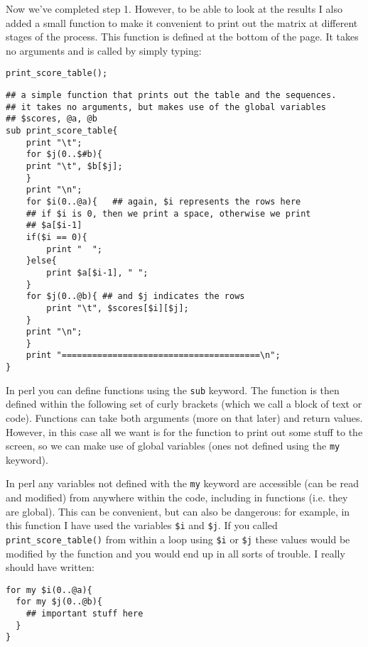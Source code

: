 \documentclass[11pt]{article}
\renewcommand\scriptsize\normalsize
\begin{document}
Now we've completed step 1. However, to be able to look at the results I also
added a small function to make it convenient to print out the
matrix at different stages of the process. This function is defined at the
bottom of the page. It takes no arguments and is called by simply typing:
\begin{verbatim}
print_score_table();
\end{verbatim}

\begin{verbatim}
## a simple function that prints out the table and the sequences.
## it takes no arguments, but makes use of the global variables
## $scores, @a, @b
sub print_score_table{
    print "\t";
    for $j(0..$#b){
	print "\t", $b[$j];
    }
    print "\n";
    for $i(0..@a){   ## again, $i represents the rows here
	## if $i is 0, then we print a space, otherwise we print
	## $a[$i-1]
	if($i == 0){
	    print "  ";
	}else{
	    print $a[$i-1], " ";
	}
	for $j(0..@b){ ## and $j indicates the rows
	    print "\t", $scores[$i][$j];
	}
	print "\n";
    }
    print "=======================================\n";
}
\end{verbatim}

In perl you can define functions using the \texttt{sub} keyword. The function
is then defined within the following set of curly brackets (which we call a
block of text or code). Functions can take both arguments (more on that later)
and return values. However, in this case all we want is for the function to
print out some stuff to the screen, so we can make use of global variables
(ones not defined using the \texttt{my} keyword). 

In perl any variables not defined with the
\texttt{my} keyword are accessible (can be read and modified) from anywhere
within the code, including in functions (i.e. they are global). This can be convenient, but can also
be dangerous: for example, in this function I have used the variables
\texttt{\$i} and \texttt{\$j}. If you called \texttt{print\_score\_table()} from
within a loop using \texttt{\$i} or \texttt{\$j} these values would be
modified by the function and you would end up in all sorts of trouble. I
really should have written:

\begin{verbatim}
for my $i(0..@a){
  for my $j(0..@b){
    ## important stuff here
  }
}
\end{verbatim}
\end{document}
